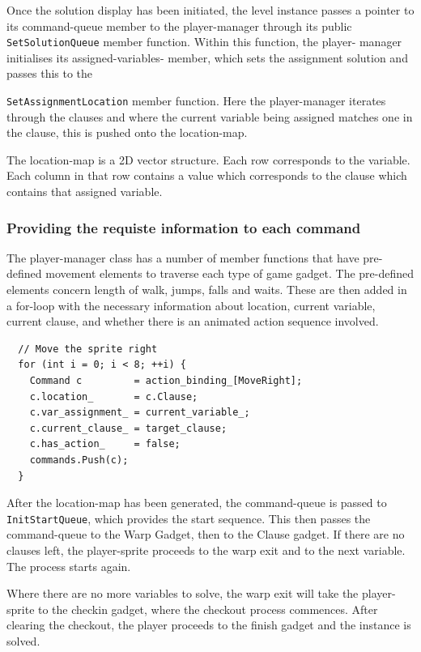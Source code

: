 \documentclass[11pt, a4paper, oneside]{report} %
\begin{document}
Once the solution display has been initiated, the level instance passes a
pointer to its command-queue member to the player-manager through its public
\texttt{SetSolutionQueue} member function. Within this function, the player-
manager initialises its assigned-variables- member, which sets the assignment
solution and passes this to the 
\par \noindent \texttt{SetAssignmentLocation} member function.
Here the player-manager iterates through the clauses and where the current
variable being assigned matches one in the clause, this is pushed onto the
location-map.

The location-map is a 2D vector structure. Each row corresponds to the variable.
Each column in that row contains a value which corresponds to the clause which
contains that assigned variable.

\subsubsection{Providing the requiste information to each command}

The player-manager class has a number of member functions that have pre-defined
movement elements to traverse each type of game gadget. The pre-defined elements
concern length of walk, jumps, falls and waits. These are then added in a 
for-loop with the necessary information about location, current variable, current
clause, and whether there is an animated action sequence involved.
\begin{lstlisting}
  // Move the sprite right
  for (int i = 0; i < 8; ++i) {
    Command c         = action_binding_[MoveRight];
    c.location_       = c.Clause;
    c.var_assignment_ = current_variable_;
    c.current_clause_ = target_clause;
    c.has_action_     = false;
    commands.Push(c);
  }
\end{lstlisting}

After the location-map has been generated, the command-queue is passed to
\texttt{InitStartQueue}, which provides the start sequence. This then passes the
command-queue to the Warp Gadget, then to the Clause gadget. If there are no
clauses left, the player-sprite proceeds to the warp exit and to the next
variable. The process starts again.

Where there are no more variables to solve, the warp exit will take the player-
sprite to the checkin gadget, where the checkout process commences. After
clearing the checkout, the player proceeds to the finish gadget and the instance
is solved.
\end{document}
